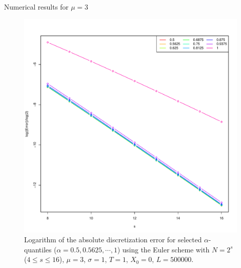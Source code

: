 \documentclass[cjk,10pt]{beamer}
\begin{document}
\begin{frame}{Numerical results for $\mu=3$} 
\begin{figure}[p]
   \includegraphics[scale=0.3]{nout_4_25_3alog.pdf}
   \caption{Logarithm of the absolute discretization error for selected $\alpha$-quantiles ($\alpha = 0.5, 0.5625, \cdots, 1$) using the Euler scheme with $N = 2^s$ ($4\le s \le 16$), $\mu=3$, $\sigma=1$, $T=1$, $X_0=0$, $L=500000$.} 
   \label{f:lab3}
\end{figure}
\end{frame}
 
\end{document}
